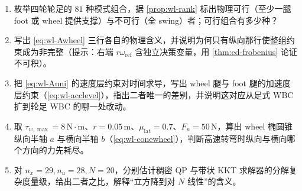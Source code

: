 \begin{practice}[本章自测]
\begin{enumerate}
  \item 枚举四轮轮足的 $81$ 种模式组合，据 \cref{prop:wl-rank} 标出物理可行（至少一腿 foot 或 wheel 提供支撑）与不可行（全 swing）者；可行组合有多少种？
  \item 写出 \cref{eq:wl-Awheel} 三行各自的物理含义，并说明为何只有纵向那行使整组约束成为非完整（提示：右端 $r\omega_{\mathrm{ref}}$ 含独立决策变量，用 \cref{thm:cd-frobenius} 论证不可积）。
  \item 把 \cref{eq:wl-Auni} 的速度层约束对时间求导，写出 wheel 腿与 foot 腿的加速度层约束（\cref{eq:wl-acclevel}），指出二者唯一的差别，并说明这对应从足式 WBC 扩到轮足 WBC 的哪一处改动。
  \item 取 $\tau_{w,\max}=8\,\mathrm{N\cdot m}$、$r=0.05\,\mathrm{m}$、$\mu_{\mathrm{lat}}=0.7$、$F_n=50\,\mathrm{N}$，算出 wheel 椭圆锥纵向半轴 $a$ 与横向半轴 $b$（\cref{eq:wl-conewheel}），判断高速转弯时纵向与横向哪个方向的力先耗尽。
  \item 对 $n_x=29,n_u=28,N=20$，分别估计稠密 QP 与带状 KKT 求解器的分解复杂度量级，给出二者之比，解释“立方降到对 $N$ 线性”的含义。
\end{enumerate}
\end{practice}

